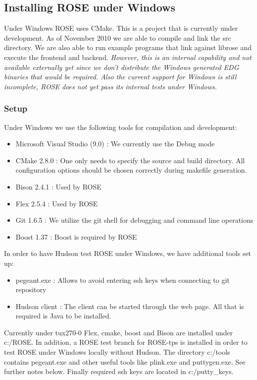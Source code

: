 \subsection{Installing ROSE under Windows}
Under Windows ROSE uses CMake. This is a project that is currently under development. As
of November 2010 we are able to compile and link the src directory. We are also able to 
run example programs that link against librose and execute the frontend and backend.
{\em However, this is an internal capability and not available externally yet since we don't
distribute the Windows generated EDG binaries that would be required.  Also the
current support for Windows is still incomplete, ROSE does not yet pass its internal
tests under Windows.}

\subsubsection{Setup}
   Under Windows we use the following tools for compilation and development:

\begin{itemize}
\item Microsoft Visual Studio (9.0) : We currently use the Debug mode
\item CMake 2.8.0 : One only needs to specify the source and build directory. All configuration options should be chosen correctly during makefile generation.
\item Bison 2.4.1 : Used by ROSE
\item Flex 2.5.4 : Used by ROSE
\item Git 1.6.5 : We utilize the git shell for debugging and command line operations
\item Boost 1.37 : Boost is required by ROSE
\end{itemize}

In order to have Hudson test ROSE under Windows, we have additional tools set up:

\begin{itemize}
\item pegeant.exe : Allows to avoid entering ssh keys when connecting to git repository
\item Hudson client : The client can be started through the web page. All that is required is Java to be installed.
\end{itemize}

Currently under tux270-0 Flex, cmake, boost and Bison are installed under c:/ROSE. In
addition, a ROSE test branch for ROSE-tps is installed in order to test ROSE under
Windows locally without Hudson. The directory c:/tools contains pegeant.exe and other
useful tools like plink.exe and puttygen.exe. See further notes below. Finally
required ssh keys are located in c:/putty\_keys.

